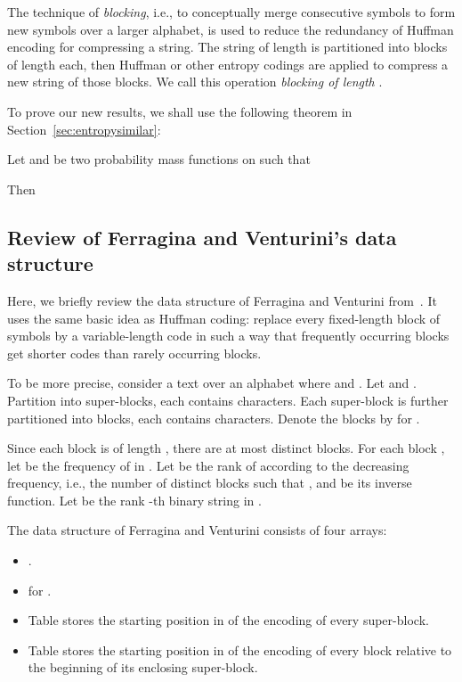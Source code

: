 \documentclass{llncs}
\begin{document}
The technique of \emph{blocking}, i.e., to conceptually merge consecutive
symbols to form new symbols over a larger alphabet, 
is used to reduce the redundancy of Huffman encoding
for compressing a string.  The string  of length  is partitioned into  blocks
of length  each, then Huffman or other entropy codings are applied to compress a new string
 of those blocks.  We call this operation \emph{blocking of length }.


To prove our new results, we shall use the following theorem in
Section~\ref{sec:entropysimilar}:
\begin{theorem}\label{th:l1bound}
Let  and  be two probability mass functions on  such that

Then

\end{theorem}


\subsection{Review of Ferragina and Venturini's data structure}\label{sec:FV}

Here, we briefly review the data structure of Ferragina and
Venturini from~\cite{FerVen07b}.
It uses the same basic idea as Huffman coding:
replace every fixed-length block of symbols by a variable-length code
in such a way that frequently occurring blocks get shorter codes than
rarely occurring blocks.

To be more precise, consider a text  over an alphabet  
where  and .
Let  and .
Partition  into  super-blocks,
each contains  characters.
Each super-block is further partitioned into  blocks,
each contains  characters.
Denote the  blocks
by  for .

Since each block is of length , there are 
at most  distinct blocks.
For each block ,
let  be
the frequency of  in .
Let  be the rank of  according to the
decreasing frequency, i.e., the number of distinct blocks  such that ,
and  be its inverse function.
Let  be the rank -th binary string in
.


The data structure of Ferragina and Venturini consists of four arrays:
\begin{itemize}
\item[{\raise0.3pt\hbox{}}]
.

\item[{\raise0.3pt\hbox{}}]
 for .

\item[{\raise0.3pt\hbox{}}]
Table  stores 
the starting position in  of the encoding of every super-block.

\item[{\raise0.3pt\hbox{}}]
Table  stores
the starting position in  of the encoding of every block relative to 
the beginning of its enclosing super-block.
\end{itemize}
\end{document}
